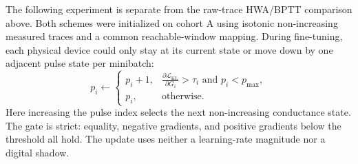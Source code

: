 \documentclass{article}
\begin{document}
The following experiment is separate from the raw-trace HWA/BPTT comparison
above. Both schemes were initialized on cohort A using isotonic non-increasing
measured traces and a common reachable-window mapping. During fine-tuning,
each physical device could only stay at its current state or move down by one
adjacent pulse state per minibatch:
\[
  p_i \leftarrow
  \begin{cases}
    p_i+1, & \displaystyle
      \frac{\partial \mathcal{L}_{\mathrm{KL}}}{\partial G_i} > \tau_i
      \text{ and } p_i < p_{\max}, \\
    p_i, & \text{otherwise.}
  \end{cases}
\]
Here increasing the pulse index selects the next non-increasing conductance
state. The gate is strict: equality, negative gradients, and positive
gradients below the threshold all hold. The update uses neither a
learning-rate magnitude nor a digital shadow.

\begin{table}[ht]
  \centering
  \caption{Fixed raw-gradient thresholds calibrated at each scheme's shared
  isotonic initialization. Eight-device entries show $G^+/G^-$ thresholds.}
  \label{tab:four-vs-eight-gradient-thresholds}
  \small
\end{table}
\end{document}
